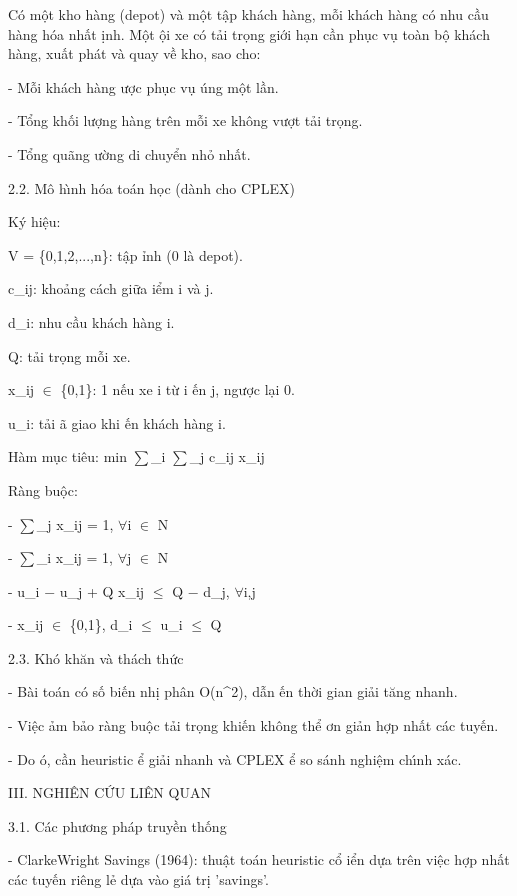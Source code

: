\documentclass[12pt]{article}
\begin{document}
C\'o một kho h\`ang (depot) v\`a một tập kh\'ach h\`ang, mỗi kh\'ach h\`ang c\'o nhu cầu h\`ang h\'oa nhất {\dj}ịnh. Một {\dj}ội xe c\'o tải trọng giới hạn cần phục vụ to\`an bộ kh\'ach h\`ang, xuất ph\'at v\`a quay về kho, sao cho:

- Mỗi kh\'ach h\`ang {\dj}ược phục vụ {\dj}\'ung một lần.

- Tổng khối lượng h\`ang tr\^en mỗi xe kh\^ong vượt tải trọng.

- Tổng qu\~ang {\dj}ường di chuyển nhỏ nhất.

2.2. M\^o h{\`\i}nh h\'oa to\'an học (d\`anh cho CPLEX)

K\'y hiệu:

V = \{0,1,2,...,n\}: tập {\dj}ỉnh (0 l\`a depot).

c\_ij: khoảng c\'ach giữa {\dj}iểm i v\`a j.

d\_i: nhu cầu kh\'ach h\`ang i.

Q: tải trọng mỗi xe.

x\_ij \ensuremath{\in} \{0,1\}: 1 nếu xe {\dj}i từ i {\dj}ến j, ngược lại 0.

u\_i: tải {\dj}\~a giao khi {\dj}ến kh\'ach h\`ang i.

H\`am mục ti\^eu: min \ensuremath{\sum}\_i \ensuremath{\sum}\_j c\_ij x\_ij

R\`ang buộc:

- \ensuremath{\sum}\_j x\_ij = 1, \ensuremath{\forall}i \ensuremath{\in} N

- \ensuremath{\sum}\_i x\_ij = 1, \ensuremath{\forall}j \ensuremath{\in} N

- u\_i \ensuremath{-} u\_j + Q x\_ij \ensuremath{\leq} Q \ensuremath{-} d\_j, \ensuremath{\forall}i,j

- x\_ij \ensuremath{\in} \{0,1\}, d\_i \ensuremath{\leq} u\_i \ensuremath{\leq} Q

2.3. Kh\'o kh\u{a}n v\`a th\'ach thức

- B\`ai to\'an c\'o số biến nhị ph\^an O(n{\textasciicircum}2), dẫn {\dj}ến thời gian giải t\u{a}ng nhanh.

- Việc {\dj}ảm bảo r\`ang buộc tải trọng khiến kh\^ong thể {\dj}ơn giản hợp nhất c\'ac tuyến.

- Do {\dj}\'o, cần heuristic {\dj}ể giải nhanh v\`a CPLEX {\dj}ể so s\'anh nghiệm ch{\'\i}nh x\'ac.

III. NGHI\^EN CỨU LI\^EN QUAN

3.1. C\'ac phương ph\'ap truyền thống

- Clarke{\textendash}Wright Savings (1964): thuật to\'an heuristic cổ {\dj}iển dựa tr\^en việc hợp nhất c\'ac tuyến ri\^eng lẻ dựa v\`ao gi\'a trị 'savings'.
\end{document}
